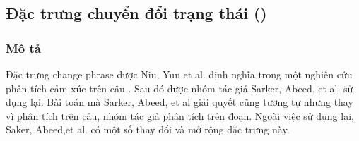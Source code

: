 \subsection{Đặc trưng chuyển đổi trạng thái ()}
\subsubsection*{Mô tả}
Đặc trưng change phrase được Niu, Yun et al. định nghĩa trong một nghiên cứu phân tích cảm xúc trên câu \cite{niu2005analysis}. Sau đó được nhóm tác giả Sarker, Abeed, et al. sử dụng lại. Bài toán mà Sarker, Abeed, et al giải quyết cũng tương tự nhưng thay vì phân tích trên câu, nhóm tác giả phân tích trên đoạn. Ngoài việc sử dụng lại, Saker, Abeed,et al. có một số thay đổi và mở rộng đặc trưng này.\\

